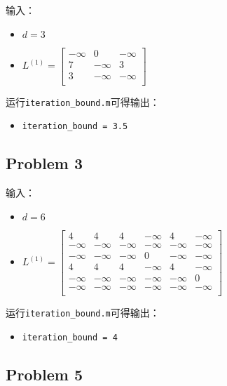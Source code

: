 \documentclass[paper=a4, fontsize=11pt]{scrartcl} %
\begin{document}
输入：
\begin{itemize}
    \item $d=3$
    \item $L^{(1)} = \begin{bmatrix}
        -\infty & 0 & -\infty \\
        7 & -\infty & 3 \\
        3 & -\infty & -\infty \\
    \end{bmatrix} $
\end{itemize}

运行\texttt{iteration\_bound.m}可得输出：
\begin{itemize}
    \item \texttt{iteration\_bound = 3.5}
\end{itemize}


\subsection{Problem 3} %
\label{sub:problem_3}

输入：
\begin{itemize}
    \item $d=6$
    \item $L^{(1)} = \begin{bmatrix}
        4 & 4 & 4 & -\infty & 4 & -\infty \\
        -\infty & -\infty & -\infty & -\infty & -\infty & -\infty \\
        -\infty & -\infty & -\infty & 0 & -\infty & -\infty \\
        4 & 4 & 4 & -\infty & 4 & -\infty \\
        -\infty & -\infty & -\infty & -\infty & -\infty & 0 \\
        -\infty & -\infty & -\infty & -\infty & -\infty & -\infty \\
    \end{bmatrix} $
\end{itemize}

运行\texttt{iteration\_bound.m}可得输出：
\begin{itemize}
    \item \texttt{iteration\_bound = 4}
\end{itemize}


\subsection{Problem 5} %
\label{sub:problem_5}
\end{document}
